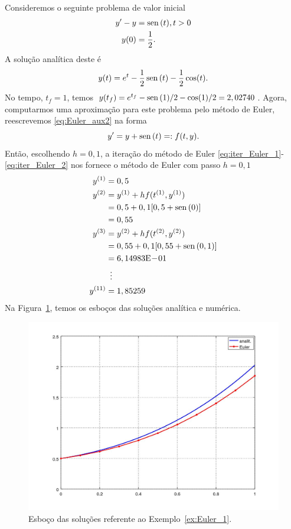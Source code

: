 \begin{ex}\label{ex:Euler_1}
  Consideremos o seguinte problema de valor inicial
  \begin{align}
    y' - y &= \operatorname{sen}\,(t), t>0\label{eq:Euler_aux2}\\
    y(0) &= \frac{1}{2}.
  \end{align}
  A solução analítica deste é
  \begin{equation}
    y(t) = e^t - \frac{1}{2}\operatorname{sen}\,(t) - \frac{1}{2}\cos(t).
  \end{equation}
No tempo, $t_f=1$, temos $y(t_f)=e^{t_f} - \operatorname{sen}\,(1)/2 - \cos(1)/2 = 2,02740$. Agora, computarmos uma aproximação para este problema pelo método de Euler, reescrevemos \eqref{eq:Euler_aux2} na forma
\begin{equation}
  y' = y + \operatorname{sen}\,(t) =: f(t,y).
\end{equation}
Então, escolhendo $h=0,1$, a iteração do método de Euler \eqref{eq:iter_Euler_1}-\eqref{eq:iter_Euler_2} nos fornece
o método de Euler com passo $h=0,1$
\begin{align}
  y^{(1)} &= 0,5\\
  y^{(2)} &= y^{(1)} + hf(t^{(1)},y^{(1)})\nonumber\\
  &= 0,5 + 0,1[0,5 + \operatorname{sen}\,(0)]\nonumber\\
  &= 0,55\\
  y^{(3)} &= y^{(2)} + hf(t^{(2)},y^{(2)})\nonumber\\
  &= 0,55 + 0,1[0,55 + \operatorname{sen}\,(0,1)]\nonumber\\
  &= 6,14983\mathrm{E}\!-\!01\\
  &\,~\vdots\nonumber\\
  y^{(11)} &= 1,85259
\end{align}
Na Figura~\ref{fig:ex_Euler_1}, temos os esboços das soluções analítica e numérica.

\begin{figure}[h!]
  \centering
  \includegraphics[width=\textwidth]{./cap_pvi/dados/ex_Euler_1/ex_Euler_1}
  \caption{Esboço das soluções referente ao Exemplo~\ref{ex:Euler_1}.}
  \label{fig:ex_Euler_1}
\end{figure}


\end{ex}
